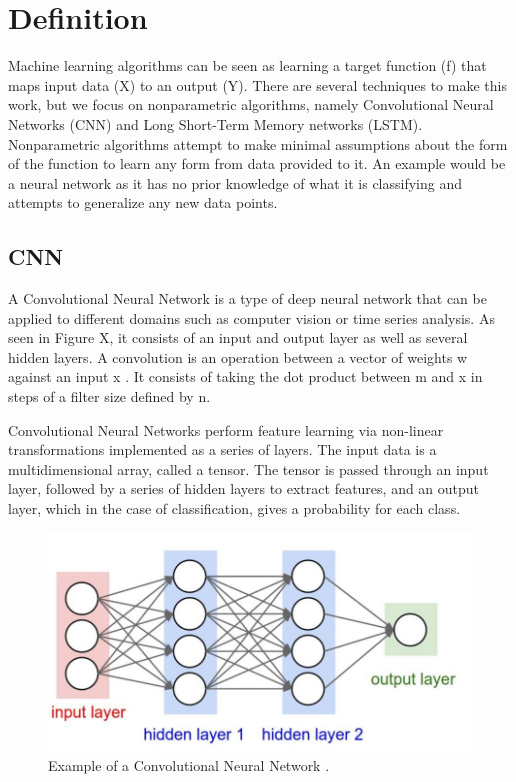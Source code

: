 \documentclass{turabian-thesis}
\newcounter{case}[section]
\begin{document}


\section{Definition}
Machine learning algorithms can be seen as learning a target function (f) that maps input data (X) to an output (Y). There are several techniques to make this work, but we focus on nonparametric algorithms, namely Convolutional Neural Networks (CNN) and Long Short-Term Memory networks (LSTM). Nonparametric algorithms attempt to make minimal assumptions about the form of the function to learn any form from data provided to it. An example would be a neural network as it has no prior knowledge of what it is classifying and attempts to generalize any new data points.

\subsection{CNN}

A Convolutional Neural Network is a type of deep neural network that can be applied to different domains such as computer vision or time series analysis. As seen in Figure X, it consists of an input and output layer as well as several hidden layers. A convolution is an operation between a vector of weights w against an input x \cite{yamashita_convolutional_2018}. It consists of taking the dot product between m and x in steps of a filter size defined by n.

Convolutional Neural Networks perform feature learning via non-linear transformations implemented as a series of layers. The input data is a multidimensional array, called a tensor. The tensor is passed through an input layer, followed by a series of hidden layers to extract features, and an output layer, which in the case of classification, gives a probability for each class. 

\begin{figure}[h!]
   \begin{center}
      \includegraphics[scale=0.3]{../media/nn_highlight.jpeg}
   \end{center}
   \caption{Example of a Convolutional Neural Network \cite{yamashita_convolutional_2018}.}
   \label{fig:cnn_example}
\end{figure}
\end{document}
